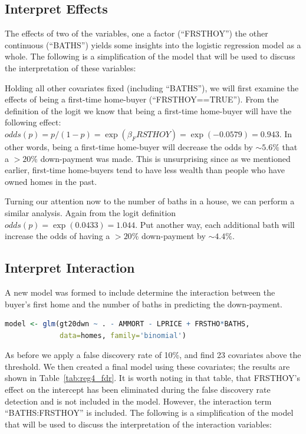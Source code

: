 \documentclass[11pt, fleqn]{article}
\begin{document}


\subsection{Interpret Effects}
The effects of two of the variables, one a factor (``FRSTHOY'') the other continuous (``BATHS'') yields some insights into the logistic regression model as a whole.  The following is a simplification of the model that will be used to discuss the interpretation of these variables:


Holding all other covariates fixed (including ``BATHS''), we will first examine the effects of being a first-time home-buyer (``FRSTHOY==TRUE'').  From the definition of the logit we know that being a first-time home-buyer will have the following effect: $odds(p)=p/(1-p)=\exp(\beta_FRSTHOY)=\exp(-0.0579)=0.943$.  In other words, being a first-time home-buyer will decrease the odds by $\sim5.6\%$ that a $>20\%$ down-payment was made.  This is unsurprising since as we mentioned earlier, first-time home-buyers tend to have less wealth than people who have owned homes in the past.

Turning our attention now to the number of baths in a house, we can perform a similar analysis.  Again from the logit definition $odds(p)=\exp(0.0433)=1.044$.  Put another way, each additional bath will increase the odds of having a $>20\%$ down-payment by $\sim4.4\%$.

\subsection{Interpret Interaction}
A new model was formed to include determine the interaction between the buyer's first home and the number of baths in predicting the down-payment.

\begin{lstlisting}[language=R]
model <- glm(gt20dwn ~ . - AMMORT - LPRICE + FRSTHO*BATHS, 
             data=homes, family='binomial')
\end{lstlisting}

As before we apply a false discovery rate of 10\%, and find 23 covariates above the threshold.  We then created a final model using these covariates; the results are shown in Table~\vref{tab:reg4_fdr}.  It is worth noting in that table, that FRSTHOY's effect on the intercept has been eliminated during the false discovery rate detection and is not included in the model.  However, the interaction term ``BATHS:FRSTHOY'' is included.  The following is a simplification of the model that will be used to discuss the interpretation of the interaction variables:
\end{document}
